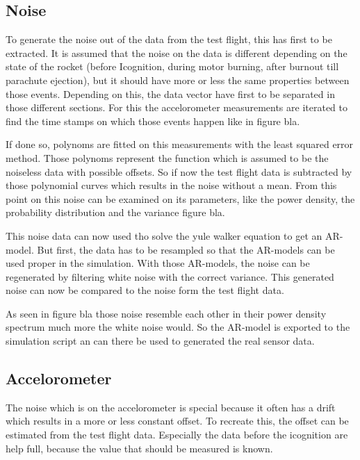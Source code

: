 
\subsection{Noise}
To generate the noise out of the data from the test flight, this has first to be extracted.
It is assumed that the noise on the data is different depending on the state of the rocket (before Icognition, during motor burning, after burnout till parachute ejection),
but it should have more or less the same properties between those events.
Depending on this, the data vector have first to be separated in those different sections.
For this the accelorometer measurements are iterated to find the time stamps on which those events happen like in figure bla.


If done so, polynoms are fitted on this measurements with the least squared error method.
Those polynoms represent the function which is assumed to be the noiseless data with possible offsets.
So if now the test flight data is subtracted by those polynomial curves which results in the noise without a mean.
From this point on this noise can be examined on its parameters, like the power density, the probability distribution and the variance figure bla.


This noise data can now used tho solve the yule walker equation to get an AR-model.
But first, the data has to be resampled so that the AR-models can be used proper in the simulation.
With those AR-models, the noise can be regenerated by filtering white noise with the correct variance.
This generated noise can now be compared to the noise form the test flight data.


As seen in figure bla those noise resemble each other in their power density spectrum much more the white noise would.
So the AR-model is exported to the simulation script an can there be used to generated the real sensor data.

\subsection{Accelorometer}
The noise which is on the accelorometer is special because it often has a drift which results in a more or less constant offset.
To recreate this, the offset can be estimated from the test flight data.
Especially the data before the icognition are help full, because the value that should be measured is known.

